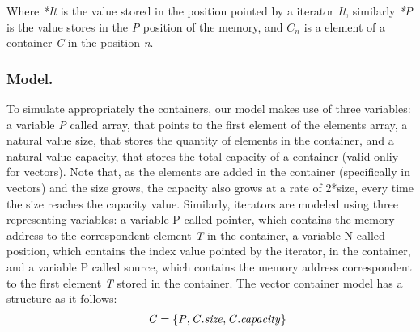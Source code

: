 \documentclass[a4paper]{llncs}
\newcommand{\comment}[1]{}
\begin{document}
%
Where \emph{*It} is the value stored in the position pointed by a iterator \emph{It}, similarly \emph{*P} is the value stores in the \emph{P} position of the memory, and $\mathit{C_n}$ is a element of a container \emph{C} in the position \emph{n}.
%
\comment{
To test the assertions, we use Booleans expressions, with the following syntax: 
%

\[\begin{array}{r@{\:\:}c@{\:\:}l}\label{boolean-semantics}
\\[-5ex]
\mathit{Bool}  & ::= & \: \mathit{Int} ( < \: | \: > \: | = \: | \: ... ) \mathit{Int} \: | \\
               &     & \: \mathit{It} ( < \: | \:> \: | \: = \: | \: ... ) \mathit{It}  \: | \\
               &     & \: \mathit{T} \: = \: \mathit{T} \: | \: \neg\mathit{Bool} \: | \\
               &     & \: \textit{Bool} ( \vee \: | \: \wedge | \: ... ) \textit{Bool} \: \\
               
\end{array}
\]
}
\subsubsection{Model.}
	To simulate appropriately the containers, our model makes use of three variables: a variable \textit{P} called array, that points to the first element of the elements array, a natural value size, that stores the quantity of elements in the container, and a natural value capacity, that stores the total capacity of a container (valid onliy for vectors). Note that, as the elements are added in the container (specifically in vectors) and the size grows, the capacity also grows at a rate of 2*size, every time the size reaches the capacity value.
	Similarly, iterators are modeled using three representing variables: a variable P called pointer, which contains the memory address to the correspondent element \textit{T} in the container, a variable N called position, which contains the index value pointed by the iterator, in the container, and a variable P called source, which contains the memory address correspondent to the first element \textit{T} stored in the container.
	The vector container model has a structure as it follows:
	
	\[\begin{array}{r@{\:\:}c@{\:\:}l}\label{container-model}
\\[-5ex]
\ &  &\: \mathit{C} = \{ \mathit{P}, \mathit{C.size}, \mathit{C.capacity}\} \:
               
\end{array}
\]
	
\end{document}
